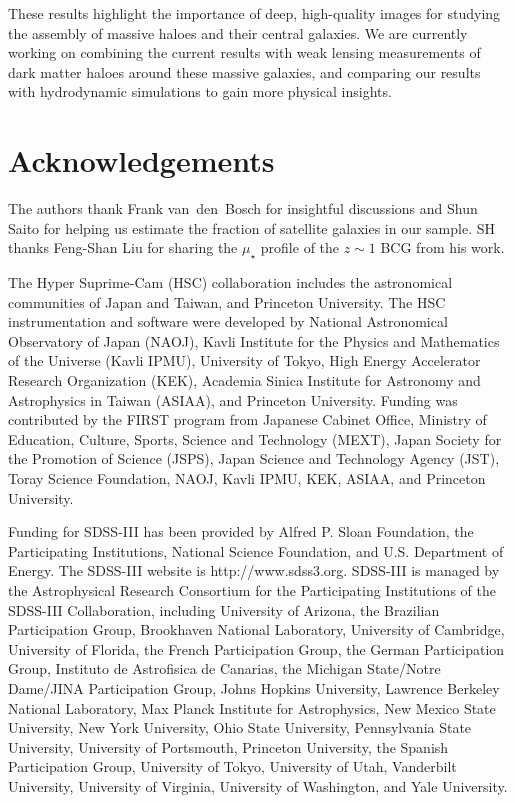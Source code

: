 \documentclass[a4paper,fleqn,usenatbib]{mnras}
\def\mden{{$\mu_{\star}$}}
\begin{document}
    These results highlight the importance of deep, high-quality images for studying 
    the assembly of massive haloes and their central galaxies. 
    We are currently working on combining the current results with weak lensing 
    measurements of dark matter haloes around these massive galaxies, and comparing 
    our results with hydrodynamic simulations to gain more physical insights. 


\section*{Acknowledgements}

  The authors thank Frank van~den~Bosch for insightful discussions and 
  Shun Saito for helping us estimate the fraction of satellite galaxies in our sample.
  SH thanks Feng-Shan Liu for sharing the \mden{} profile of the $z\sim1$ BCG from 
  his work.

  The Hyper Suprime-Cam (HSC) collaboration includes the astronomical communities of 
  Japan and Taiwan, and Princeton University.  The HSC instrumentation and software were
  developed by National Astronomical Observatory of Japan (NAOJ), Kavli Institute
  for the Physics and Mathematics of the Universe (Kavli IPMU), University of Tokyo,
  High Energy Accelerator Research Organization (KEK), Academia Sinica Institute
  for Astronomy and Astrophysics in Taiwan (ASIAA), and Princeton University.  
  Funding was contributed by the FIRST program from Japanese Cabinet Office,  Ministry 
  of Education, Culture, Sports, Science and Technology (MEXT), Japan Society for 
  the Promotion of Science (JSPS), Japan Science and Technology Agency (JST), Toray 
  Science Foundation, NAOJ, Kavli IPMU, KEK, ASIAA, and Princeton University.
   
  Funding for SDSS-III has been provided by Alfred P. Sloan Foundation, the 
  Participating Institutions, National Science Foundation, and U.S. Department of
  Energy. The SDSS-III website is http://www.sdss3.org.  SDSS-III is managed by the
  Astrophysical Research Consortium for the Participating Institutions of the SDSS-III
  Collaboration, including University of Arizona, the Brazilian Participation Group,
  Brookhaven National Laboratory, University of Cambridge, University of Florida, the
  French Participation Group, the German Participation Group, Instituto de Astrofisica
  de Canarias, the Michigan State/Notre Dame/JINA Participation Group, Johns Hopkins
  University, Lawrence Berkeley National Laboratory, Max Planck Institute for
  Astrophysics, New Mexico State University, New York University, Ohio State University,
  Pennsylvania State University, University of Portsmouth, Princeton University, the
  Spanish Participation Group, University of Tokyo, University of Utah, Vanderbilt
  University, University of Virginia, University of Washington, and Yale University.
  
\end{document}
